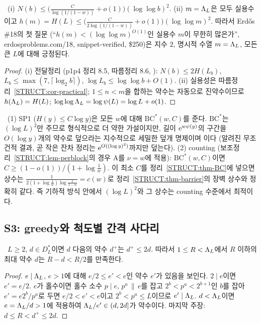 \begin{corollary}[$N(b)$와 Erdős \#18]\label{STRUCT:cor-BC-conseq}
\ (i) $N(b)\le\bigl(\frac{C}{\log(1/(1-w))}+o(1)\bigr)(\log\log b)^2$.
(ii) $m=\Lambda_L$은 모두 실용수이고 $h(m)=H(L)\le\bigl(\frac{C}{2\log(1/(1-w))}+o(1)\bigr)(\log\log m)^2$. 따라서 Erdős \#18의 첫 질문 (``$h(m)<(\log\log m)^{O(1)}$인 실용수 $m$이 무한히 많은가'', erdosproblems.com/18, snippet-verified, \$250)은 지수 $2$, 명시적 수열 $m=\Lambda_L$, 모든 큰 $L$에 대해 긍정된다.
\end{corollary}
\begin{proof}
(i) 전달정리 (p1p4 정리 8.5, 따름정리 8.6, \PROVED): $N(b)\le2H(L_b)$, $L_b\le\max(7,\lceil\log_2b\rceil)$, $\log L_b\le\log\log b+O(1)$. (ii) 실용성은 따름정리~\ref{STRUCT:cor-practical}; $1\le n<m$을 합하는 약수는 자동으로 진약수이므로 $h(\Lambda_L)=H(L)$; $\log\log\Lambda_L=\log\psi(L)=\log L+o(1)$.
\end{proof}

\begin{remark}\label{STRUCT:rem-BC}
\PROVED\ (1) SP1 ($H(y)\le C\log y$)은 모든 $w$에 대해 $\mathrm{BC}^*(w,C)$를 준다. $\mathrm{BC}^*$는 $(\log L)^2$만 주므로 형식적으로 더 약한 가설이지만, 길이 $\mathrm{e}^{w\psi(y)}$의 구간을 $O(\log y)$개의 약수로 덮으라는 지수적으로 세밀한 덮개 명제이며 \OPEN 이다 (알려진 무조건적 결과, 곧 작은 잔차 정리는 $\mathrm{e}^{O((\log y)^2)}$까지만 덮는다).
(2) counting (보조정리~\ref{STRUCT:lem-perblock}의 경우 A를 $\nu=w$에 적용): $\mathrm{BC}^*(w,C)$이면 $C\ge(1-o(1))/(1+\log\frac1w)$. 이 최소 $C$를 정리~\ref{STRUCT:thm-BC}에 넣으면 상수는 $\frac{1}{2(1+\log\frac1w)\log\frac1{1-w}}=c(w)$로 정리~\ref{STRUCT:thm-barrier}의 장벽 상수와 정확히 같다. 즉 기하적 방식 안에서 $(\log L)^2$와 그 상수는 counting 수준에서 최적이다.
\end{remark}

\subsection{S3: greedy와 척도별 간격 사다리}
\label{STRUCT:sec-S3}

\begin{lemma}\label{STRUCT:lem-ratio2}
\PROVED\ $L\ge2$, $d\in D^*_L$이면 $d$ 다음의 약수 $d^+$는 $d^+\le2d$. 따라서 $1\le R<\Lambda_L$에서 $R$ 이하의 최대 약수 $d$는 $R-d<R/2$를 만족한다.
\end{lemma}
\begin{proof}
$e\mid\Lambda_L$, $e>1$에 대해 $e/2\le e'<e$인 약수 $e'$가 있음을 보인다. $2\mid e$이면 $e'=e/2$. $e$가 홀수이면 홀수 소수 $p\mid e$, $p^a\,\|\,e$를 잡고 $2^b<p^a<2^{b+1}$인 $b$를 잡아 $e'=e2^b/p^a$로 두면 $e/2<e'<e$이고 $2^b<p^a\le L$이므로 $e'\mid\Lambda_L$. $d<\Lambda_L$이면 $e=\Lambda_L/d>1$에 적용하여 $\Lambda_L/e'\in(d,2d]$가 약수이다. 마지막 주장: $d\le R<d^+\le2d$.
\end{proof}

